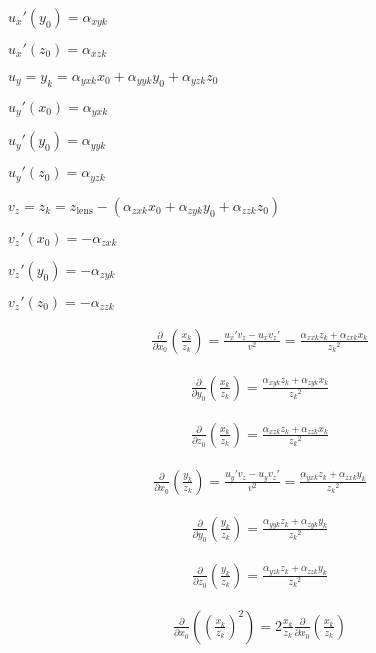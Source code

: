 \documentclass{article}
\begin{document}
${u_x}'(y_0) = \alpha_{xyk}$

${u_x}'(z_0) = \alpha_{xzk}$

$u_y = y_k = \alpha_{yxk}x_0 + \alpha_{yyk}y_0 + \alpha_{yzk}z_0$

${u_y}'(x_0) = \alpha_{yxk}$

${u_y}'(y_0) = \alpha_{yyk}$

${u_y}'(z_0) = \alpha_{yzk}$

$v_z = z_k = z_\text{lens} - (\alpha_{zxk}x_0 + \alpha_{zyk}y_0 + \alpha_{zzk}z_0)$

${v_z}'(x_0) = -\alpha_{zxk}$

${v_z}'(y_0) = -\alpha_{zyk}$

${v_z}'(z_0) = -\alpha_{zzk}$

\begin{align}
\frac{\partial}{\partial x_0}\left(\frac{x_k}{z_k}\right) = \frac{{u_x}'v_z -u_x{v_z}'}{v^2}  = \frac{\alpha_{xxk} z_k + \alpha_{zxk} x_k}{{z_k}^2}
\end{align}

\begin{align}
\frac{\partial}{\partial y_0}\left(\frac{x_k}{z_k}\right) = \frac{\alpha_{xyk} z_k + \alpha_{zyk} x_k}{{z_k}^2}
\end{align}

\begin{align}
\frac{\partial}{\partial z_0}\left(\frac{x_k}{z_k}\right) = \frac{\alpha_{xzk} z_k + \alpha_{zzk} x_k}{{z_k}^2}
\end{align}




\begin{align}
\frac{\partial}{\partial x_0}\left(\frac{y_k}{z_k}\right) = \frac{{u_y}'v_z -u_y{v_z}'}{v^2}  = \frac{\alpha_{yxk} z_k + \alpha_{zxk} y_k}{{z_k}^2}
\end{align}

\begin{align}
\frac{\partial}{\partial y_0}\left(\frac{y_k}{z_k}\right) = \frac{\alpha_{yyk} z_k + \alpha_{zyk} y_k}{{z_k}^2}
\end{align}

\begin{align}
\frac{\partial}{\partial z_0}\left(\frac{y_k}{z_k}\right) = \frac{\alpha_{yzk} z_k + \alpha_{zzk} y_k}{{z_k}^2}
\end{align}




\begin{align}
\frac{\partial}{\partial x_0}\left(\left(\frac{x_k}{z_k}\right)^2\right) = 2 \frac{x_k}{z_k} \frac{\partial}{\partial x_0}\left(\frac{x_k}{z_k}\right)
\end{align}
\end{document}
